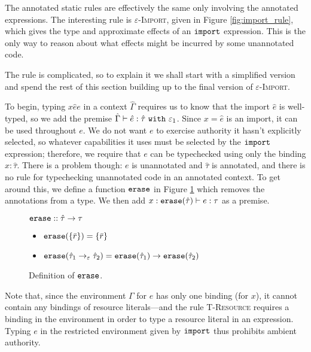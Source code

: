 The annotated static rules are effectively the same only involving the
annotated expressions. The interesting rule is
\textsc{$\varepsilon$-Import}, given in Figure \ref{fig:import_rule},
which gives the type and approximate effects of an $\mathtt{import}$
expression. This is the only way to reason about what effects might be
incurred by some unannotated code.

The rule is complicated, so to explain it we shall start with a
simplified version and spend the rest of this section building up to
the final version of \textsc{$\varepsilon$-Import}.

To begin, typing ${x}{\hat e}{e}$ in a context
$\hat \Gamma$ requires us to know that the import $\hat e$ is
well-typed, so we add the premise
$\hat \Gamma \vdash \hat e: \hat \tau~\mathtt{with}~ \varepsilon_1$. Since
$x = \hat e$ is an import, it can be used throughout $e$. We do not
want $e$ to exercise authority it hasn't explicitly selected, so
whatever capabilities it uses must be selected by the $\mathtt{import}$
expression; therefore, we require that $e$ can be typechecked using
only the binding $x: \hat \tau$. There is a problem though: $e$ is
unannotated and $\hat \tau$ is annotated, and there is no rule for
typechecking unannotated code in an annotated context. To get around
this, we define a function $\mathtt{erase}$ in Figure
\ref{fig:erase_defn} which removes the annotations from a type. We
then add $x: \mathtt{erase}(\hat \tau) \vdash e: \tau$ as a premise.

\begin{figure}[h]
\vspace{-5pt}

$\mathtt{erase} :: \hat \tau \rightarrow \tau$
\begin{itemize}
	\setlength\itemsep{-0.2em}
	\item[] $\mathtt{erase}(\{ \bar r \}) = \{ \bar r \}$
	\item[] $\mathtt{erase}(\hat \tau_1 \rightarrow_{\varepsilon} \hat \tau_2) = \mathtt{erase}(\hat \tau_1) \rightarrow \mathtt{erase}(\hat \tau_2)$
\end{itemize}

\vspace{-7pt}
\caption{Definition of $\mathtt{erase}$.}
\label{fig:erase_defn}
\end{figure}

Note that, since the environment $\Gamma$ for $e$ has only one binding
(for $x$), it cannot contain any bindings of resource literals---and
the rule \textsc{T-Resource} requires a binding in the environment in
order to type a resource literal in an expression. Typing $e$ in the
restricted environment given by $\mathtt{import}$ thus prohibits ambient
authority.

